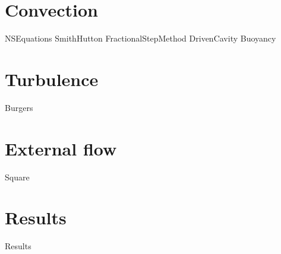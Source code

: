 \part{Convection}
{NSEquations}
{SmithHutton}
{FractionalStepMethod}
{DrivenCavity}
{Buoyancy}

\part{Turbulence}
{Burgers}

\part{External flow}
{Square}

\part{Results}
{Results}







